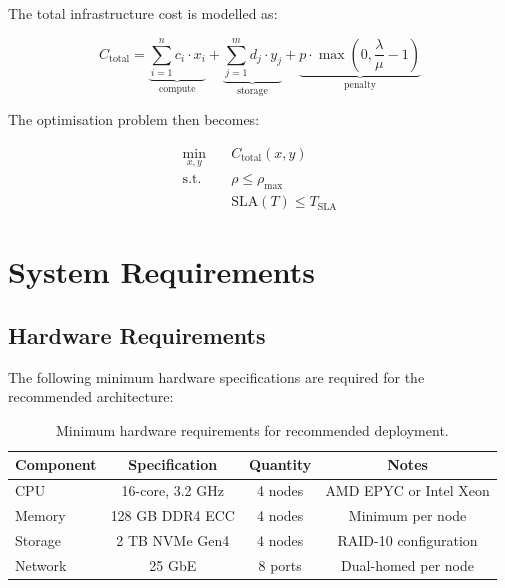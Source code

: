 \documentclass[
    language=english,
    doctype=technical-report,
    institution=none,
    titlestyle=book,
    oneside,
    loadGlossaries,
]{../../omnilatex}
\begin{document}
The total infrastructure cost is modelled as:

\begin{equation}
    C_{\text{total}} = \underbrace{\sum_{i=1}^{n} c_i \cdot x_i}_{\text{compute}} +
    \underbrace{\sum_{j=1}^{m} d_j \cdot y_j}_{\text{storage}} +
    \underbrace{p \cdot \max\!\left(0, \frac{\lambda}{\mu} - 1\right)}_{\text{penalty}}
    \label{eq:cost-function}
\end{equation}

The optimisation problem then becomes:

\begin{equation}
    \begin{aligned}
        \min_{x,y} \quad & C_{\text{total}}(x, y) \\
        \text{s.t.} \quad & \rho \leq \rho_{\max} \\
        & \text{SLA}(T) \leq T_{\text{SLA}}
    \end{aligned}
    \label{eq:optimization}
\end{equation}

\printglossary[type=abbreviations,title={List of Abbreviations}]

\printbibliography

\appendix

\chapter{System Requirements}
\label{app:requirements}

\section{Hardware Requirements}

The following minimum hardware specifications are required for the
recommended architecture:

\begin{table}[htbp]
    \centering
    \caption{Minimum hardware requirements for recommended deployment.}
    \label{tab:hardware-reqs}
    \begin{tabular}{@{}lccc@{}}
        \toprule
        Component & Specification & Quantity & Notes \\
        \midrule
        CPU        & 16-core, 3.2 GHz   & 4 nodes & AMD EPYC or Intel Xeon \\
        Memory     & 128 GB DDR4 ECC     & 4 nodes & Minimum per node \\
        Storage    & 2 TB NVMe Gen4      & 4 nodes & RAID-10 configuration \\
        Network    & 25 GbE              & 8 ports & Dual-homed per node \\
        \bottomrule
    \end{tabular}
\end{table}
\end{document}
